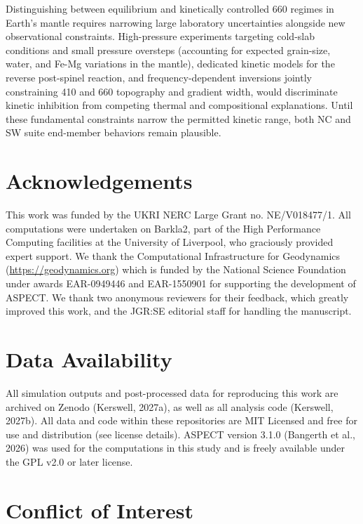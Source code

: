 \documentclass[draft,linenumbers]{agujournal2019}
\begin{document}
Distinguishing between equilibrium and kinetically controlled 660
regimes in Earth's mantle requires narrowing large laboratory
uncertainties alongside new observational constraints. High-pressure
experiments targeting cold-slab conditions and small pressure oversteps
(accounting for expected grain-size, water, and Fe-Mg variations in the
mantle), dedicated kinetic models for the reverse post-spinel reaction,
and frequency-dependent inversions jointly constraining 410 and 660
topography and gradient width, would discriminate kinetic inhibition
from competing thermal and compositional explanations. Until these
fundamental constraints narrow the permitted kinetic range, both NC and
SW suite end-member behaviors remain plausible.

\section*{Acknowledgements}\label{sec:acknowledgements}

This work was funded by the UKRI NERC Large Grant no. NE/V018477/1. All
computations were undertaken on Barkla2, part of the High Performance
Computing facilities at the University of Liverpool, who graciously
provided expert support. We thank the Computational Infrastructure for
Geodynamics (\url{https://geodynamics.org}) which is funded by the
National Science Foundation under awards EAR-0949446 and EAR-1550901 for
supporting the development of ASPECT. We thank two anonymous reviewers
for their feedback, which greatly improved this work, and the JGR:SE
editorial staff for handling the manuscript.

\section*{Data Availability}\label{sec:data-availability}

All simulation outputs and post-processed data for reproducing this work
are archived on Zenodo (Kerswell, 2027a), as well as all analysis code
(Kerswell, 2027b). All data and code within these repositories are MIT
Licensed and free for use and distribution (see license details). ASPECT
version 3.1.0 (Bangerth et al., 2026) was used for the computations in
this study and is freely available under the GPL v2.0 or later license.

\section*{Conflict of Interest}\label{sec:conflict-of-interest}
\end{document}
